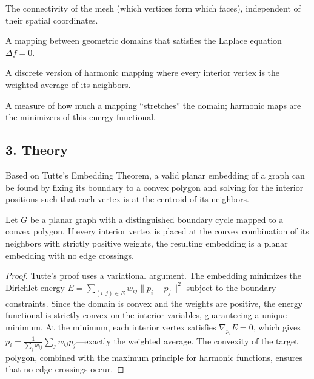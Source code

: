 \begin{definition}[Topology]\label{def:topology}
The connectivity of the mesh (which vertices form which faces), independent of their spatial coordinates.
\end{definition}

\begin{definition}\label{def:harmonic_map}
A mapping between geometric domains that satisfies the Laplace equation $\Delta f = 0$.
\end{definition}

\begin{definition}\label{def:barycentric_mapping}
A discrete version of harmonic mapping where every interior vertex is the weighted average of its neighbors.
\end{definition}

\begin{definition}\label{def:dirichlet_energy}
A measure of how much a mapping ``stretches'' the domain; harmonic maps are the minimizers of this energy functional.
\end{definition}

\subsection{3. Theory}

Based on Tutte's Embedding Theorem\cite{tutte1963}, a valid planar embedding of a graph can be found by fixing its boundary to a convex polygon and solving for the interior positions such that each vertex is at the centroid of its neighbors.

\begin{theorem}\label{thm:tutte}
Let $G$ be a planar graph with a distinguished boundary cycle mapped to a convex polygon. If every interior vertex is placed at the convex combination of its neighbors with strictly positive weights, the resulting embedding is a planar embedding with no edge crossings.
\end{theorem}

\begin{proof}
Tutte's proof\cite{tutte1963} uses a variational argument. The embedding minimizes the Dirichlet energy $E = \sum_{(i,j) \in E} w_{ij} \|p_i - p_j\|^2$ subject to the boundary constraints. Since the domain is convex and the weights are positive, the energy functional is strictly convex on the interior variables, guaranteeing a unique minimum. At the minimum, each interior vertex satisfies $\nabla_{p_i} E = 0$, which gives $p_i = \frac{1}{\sum_j w_{ij}} \sum_j w_{ij} p_j$---exactly the weighted average. The convexity of the target polygon, combined with the maximum principle for harmonic functions, ensures that no edge crossings occur.
\end{proof}

